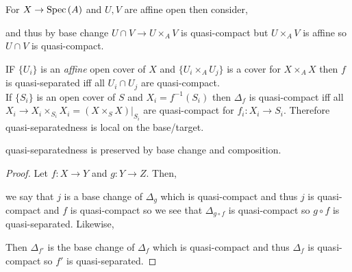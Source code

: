 \documentclass[12pt]{article}
\begin{document}
\begin{rmk}
For $X \to \mathrm{Spec}\left( A \right)$ and $U,V$ are affine open then consider,
\begin{center}
\end{center}
and thus by base change $U \cap V \to U \times_A V$ is quasi-compact but $U \times_A V$ is affine so $U \cap V$ is quasi-compact.
\end{rmk}

\begin{rmk}
IF $\{ U_i \}$ is an \textit{affine} open cover of $X$ and $\{ U_i \times_A U_j \}$ is a cover for $X \times_A X$ then $f$ is quasi-separated iff all $U_i \cap U_j$ are quasi-compact.
\bigskip\\
If $\{ S_i \}$ is an open cover of $S$ and $X_i = f^{-1}(S_i)$ then $\Delta_f$ is quasi-compact iff all $X_i \to X_i \times_{S_i} X_i = (X \times_S X) |_{S_i}$ are quasi-compact for $f_i : X_i \to S_i$. Therefore quasi-separatedness is local on the base/target.
\end{rmk}

\begin{lemma}
quasi-separatedness is preserved by base change and composition.
\end{lemma}

\begin{proof}
Let $f : X \to Y$ and $g : Y \to Z$. Then,
\begin{center}
\end{center}
we say that $j$ is a base change of $\Delta_g$ which is quasi-compact and thus $j$ is quasi-compact and $f$ is quasi-compact so we see that $\Delta_{g \circ f}$ is quasi-compact so $g \circ f$ is quasi-separated. Likewise,
\begin{center}
\end{center}
Then $\Delta_{f'}$ is the base change of $\Delta_f$ which is quasi-compact and thus $\Delta_f$ is quasi-compact so $f'$ is quasi-separated.
\end{proof}
\end{document}

